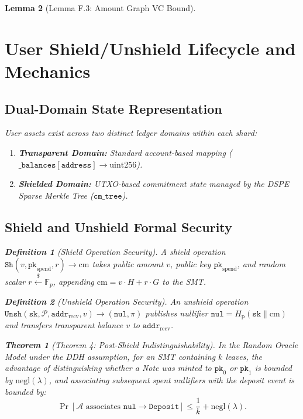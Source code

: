 \documentclass[journal,10pt,twocolumn]{IEEEtran}
\newtheorem{theorem}{Theorem}
\newtheorem{lemma}[theorem]{Lemma}
\theoremstyle{definition}
\newtheorem{definition}{Definition}
\theoremstyle{remark}
\begin{document}
\begin{lemma}[Lemma F.3: Amount Graph VC Bound]
\section{User Shield/Unshield Lifecycle and Mechanics}

\subsection{Dual-Domain State Representation}
User assets exist across two distinct ledger domains within each shard:
\begin{enumerate}
    \item \textbf{Transparent Domain:} Standard account-based mapping ($\mathtt{\_balances[address]} \to \text{uint256}$).
    \item \textbf{Shielded Domain:} UTXO-based commitment state managed by the DSPE Sparse Merkle Tree ($\mathtt{cm\_tree}$).
\end{enumerate}

\subsection{Shield and Unshield Formal Security}

\begin{definition}[Shield Operation Security]
A shield operation $\mathtt{Sh}(v, \mathtt{pk}_{\text{spend}}, r) \to \text{cm}$ takes public amount $v$, public key $\mathtt{pk}_{\text{spend}}$, and random scalar $r \xleftarrow{\$} \mathbb{F}_p$, appending $\text{cm} = v \cdot H + r \cdot G$ to the SMT.
\end{definition}

\begin{definition}[Unshield Operation Security]
An unshield operation $\mathtt{Unsh}(\mathtt{sk}, \mathcal{P}, \mathtt{addr}_{\text{recv}}, v) \to (\mathtt{nul}, \pi)$ publishes nullifier $\mathtt{nul} = H_{\text{p}}(\mathtt{sk} \parallel \text{cm})$ and transfers transparent balance $v$ to $\mathtt{addr}_{\text{recv}}$.
\end{definition}

\begin{theorem}[Theorem 4: Post-Shield Indistinguishability]
In the Random Oracle Model under the DDH assumption, for an SMT containing $k$ leaves, the advantage of distinguishing whether a Note was minted to $\mathtt{pk}_0$ or $\mathtt{pk}_1$ is bounded by $\text{negl}(\lambda)$, and associating subsequent spent nullifiers with the deposit event is bounded by:
\begin{equation}
\Pr[\mathcal{A} \text{ associates } \mathtt{nul} \to \mathtt{Deposit}] \le \frac{1}{k} + \text{negl}(\lambda).
\end{equation}
\end{theorem}


\end{lemma}
\end{document}
